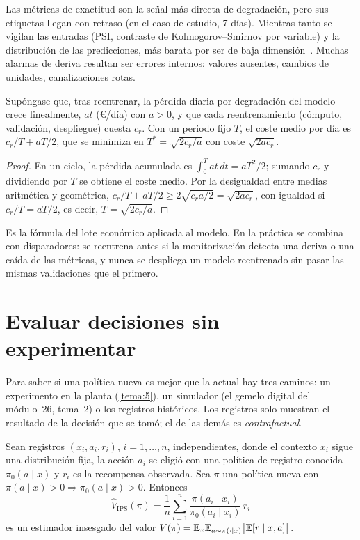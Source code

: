 Las métricas de exactitud son la señal más directa de degradación, pero sus etiquetas llegan con retraso (en el caso de estudio, 7 días). Mientras tanto se vigilan las entradas (PSI, contraste de Kolmogorov--Smirnov por variable) y la distribución de las predicciones, más barata por ser de baja dimensión~\cite{cs329s}. Muchas alarmas de deriva resultan ser errores internos: valores ausentes, cambios de unidades, canalizaciones rotas.

\begin{proposicion}\label{prop:reentreno}
Supóngase que, tras reentrenar, la pérdida diaria por degradación del modelo crece linealmente, $at$ (€/día) con $a>0$, y que cada reentrenamiento (cómputo, validación, despliegue) cuesta $c_r$. Con un periodo fijo $T$, el coste medio por día es $c_r/T+aT/2$, que se minimiza en $T^{*}=\sqrt{2c_r/a}$ con coste $\sqrt{2ac_r}$.
\end{proposicion}

\begin{proof}
En un ciclo, la pérdida acumulada es $\int_0^T at\,dt=aT^{2}/2$; sumando $c_r$ y dividiendo por $T$ se obtiene el coste medio. Por la desigualdad entre medias aritmética y geométrica, $c_r/T+aT/2\ge2\sqrt{c_ra/2}=\sqrt{2ac_r}$, con igualdad si $c_r/T=aT/2$, es decir, $T=\sqrt{2c_r/a}$.
\end{proof}

Es la fórmula del lote económico aplicada al modelo. En la práctica se combina con disparadores: se reentrena antes si la monitorización detecta una deriva o una caída de las métricas, y nunca se despliega un modelo reentrenado sin pasar las mismas validaciones que el primero.

\section{Evaluar decisiones sin experimentar}\label{sec:contrafactual}

Para saber si una política nueva es mejor que la actual hay tres caminos: un experimento en la planta (\cref{tema:5}), un simulador (el gemelo digital del módulo~26, tema~2) o los registros históricos. Los registros solo muestran el resultado de la decisión que se tomó; el de las demás es \emph{contrafactual}.

\begin{proposicion}\label{prop:ips}
Sean registros $(x_i,a_i,r_i)$, $i=1,\dots,n$, independientes, donde el contexto $x_i$ sigue una distribución fija, la acción $a_i$ se eligió con una política de registro conocida $\pi_0(a\mid x)$ y $r_i$ es la recompensa observada. Sea $\pi$ una política nueva con $\pi(a\mid x)>0\Rightarrow\pi_0(a\mid x)>0$. Entonces
\[
\hat V_{\mathrm{IPS}}(\pi)=\frac1n\sum_{i=1}^{n}\frac{\pi(a_i\mid x_i)}{\pi_0(a_i\mid x_i)}\,r_i
\]
es un estimador insesgado del valor $V(\pi)=\mathbb{E}_{x}\mathbb{E}_{a\sim\pi(\cdot\mid x)}\bigl[\mathbb{E}[r\mid x,a]\bigr]$.
\end{proposicion}

